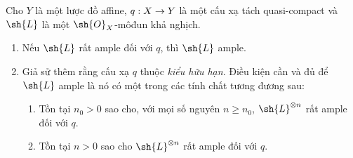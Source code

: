 \documentclass[oneside,10pt]{amsart}
\makeatletter
\renewcommand{\geq}{\geqslant}
\newcommand{\ega@arrow}[2]{\mathchoice{#1}{#2}{#2}{#2}}
\renewcommand{\to}{\ega@arrow{\longrightarrow}{\rightarrow}}
\let\EGAOriginalLabel\label
\renewcommand{\label}[1]{\phantomsection\EGAOriginalLabel{#1}}
\makeatother
\begin{document}
\begin{proposition}[4.5.10]
\label{II.4.5.10}
Cho $Y$ là một lược đồ affine, $q:X\to Y$ là một cấu xạ tách quasi-compact và $\sh{L}$ là một $\sh{O}_X$-môđun khả nghịch.
\begin{enumerate}
  \item[\rm{(i)}] Nếu $\sh{L}$ rất ample đối với $q$, thì $\sh{L}$ ample.
  \item[\rm{(ii)}] Giả sử thêm rằng cấu xạ $q$ thuộc \emph{kiểu hữu hạn}.
    Điều kiện cần và đủ để $\sh{L}$ ample là nó có một trong các tính chất tương đương sau:
    \begin{enumerate}
      \item[\rm{(e)}] Tồn tại $n_0>0$ sao cho, với mọi số nguyên $n\geq n_0$, $\sh{L}^{\otimes n}$ rất ample đối với $q$.
      \item[\rm{(e')}] Tồn tại $n>0$ sao cho $\sh{L}^{\otimes n}$ rất ample đối với $q$.
    \end{enumerate}
\end{enumerate}
\end{proposition}
\end{document}
